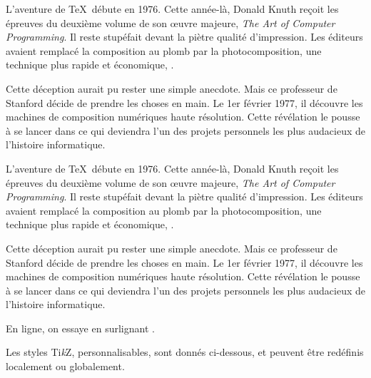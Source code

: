 \documentclass[french,11pt,a4paper]{article}
\providecommand\tikzlogo{Ti\textit{k}Z}
\let\TikZ\tikzlogo
\begin{document}
\begin{demohigh}[language=latex/latex2,style/main=cyan!10,style/code=cyan!10]
L’aventure de \TeX\ débute en 1976. Cette année-là, Donald Knuth reçoit les épreuves du deuxième volume de son œuvre majeure, \textit{The Art of Computer Programming}. Il reste stupéfait devant la piètre qualité d’impression. Les éditeurs avaient remplacé la composition au plomb par la photocomposition, une technique plus rapide et économique, .

Cette déception aurait pu rester une simple anecdote. Mais ce professeur de Stanford décide de prendre les choses en main. Le 1er février 1977, il découvre les machines de composition numériques haute résolution. Cette révélation le pousse à se lancer dans ce qui deviendra l’un des projets personnels les plus audacieux de l’histoire informatique.
\end{demohigh}

\begin{demohigh}[language=latex/latex2,style/main=cyan!10,style/code=cyan!10]
L’aventure de \TeX\ débute en 1976. Cette année-là, Donald Knuth reçoit les épreuves du deuxième volume de son œuvre majeure, \textit{The Art of Computer Programming}. Il reste stupéfait devant la piètre qualité d’impression. Les éditeurs avaient remplacé la composition au plomb par la photocomposition, une technique plus rapide et économique, .

Cette déception aurait pu rester une simple anecdote. Mais ce professeur de Stanford décide de prendre les choses en main. Le 1er février 1977, il découvre les machines de composition numériques haute résolution. Cette révélation le pousse à se lancer dans ce qui deviendra l’un des projets personnels les plus audacieux de l’histoire informatique.
\AfficherFluo[Inclinaison=-10,Couleur=cyan,Echelle=1.15]
\end{demohigh}

\begin{demohigh}[language=latex/latex2,style/main=cyan!10,style/code=cyan!10]
En ligne, on essaye en surlignant
.
\end{demohigh}

\pagebreak

Les styles \TikZ, personnalisables, sont donnés ci-dessous, et peuvent être redéfinis localement ou globalement.
\end{document}

